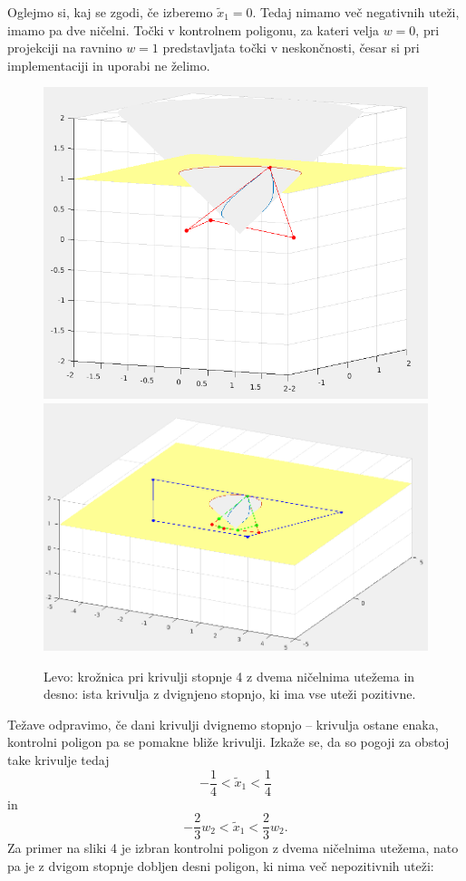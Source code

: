 \documentclass[a4paper,12pt]{article}
\begin{document}
Oglejmo si, kaj se zgodi, če izberemo $\tilde{x}_1=0$. Tedaj nimamo več negativnih uteži, imamo pa dve ničelni. Točki v kontrolnem poligonu, za kateri velja $w=0$, pri projekciji na ravnino $w=1$ predstavljata točki v neskončnosti, česar si pri implementaciji in uporabi ne želimo.
\begin{figure}[h!]
\includegraphics[scale=0.24]{nicelneutezi.png}
\includegraphics[scale=0.24]{kvinticna.png}
\centering
\caption{Levo: krožnica pri krivulji stopnje 4 z dvema ničelnima utežema in desno: ista krivulja z dvignjeno stopnjo, ki ima vse uteži pozitivne.}
\end{figure}
Težave odpravimo, če dani krivulji dvignemo stopnjo -- krivulja ostane enaka, kontrolni poligon pa se pomakne bliže krivulji. Izkaže se, da so pogoji za obstoj take krivulje tedaj $$-\frac{1}{4} < \tilde{x}_1 < \frac{1}{4}$$ in $$-\frac{2}{3}w_2 < \tilde{x}_1 <  \frac{2}{3}w_2.$$
Za primer na sliki 4 je izbran kontrolni poligon z dvema ničelnima utežema, nato pa je z dvigom stopnje dobljen desni poligon, ki nima več nepozitivnih uteži:
\end{document}
